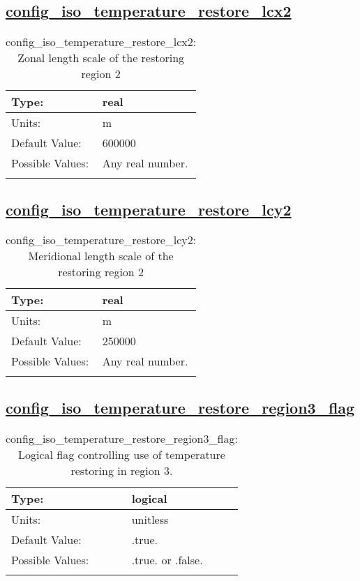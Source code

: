\subsection[config\_iso\_temperature\_restore\_lcx2]{\hyperref[sec:nm_tab_iso]{config\_iso\_temperature\_restore\_lcx2}}
\label{subsec:nm_sec_config_iso_temperature_restore_lcx2}
\begin{center}
\begin{longtable}{| p{2.0in} || p{4.0in} |}
    \hline
    Type: & real \\
    \hline
    Units: & \si{m} \\
    \hline
    Default Value: & 600000 \\
    \hline
    Possible Values: & Any real number. \\
    \hline
    \caption{config\_iso\_temperature\_restore\_lcx2: Zonal length scale of the restoring region 2}
\end{longtable}
\end{center}
\subsection[config\_iso\_temperature\_restore\_lcy2]{\hyperref[sec:nm_tab_iso]{config\_iso\_temperature\_restore\_lcy2}}
\label{subsec:nm_sec_config_iso_temperature_restore_lcy2}
\begin{center}
\begin{longtable}{| p{2.0in} || p{4.0in} |}
    \hline
    Type: & real \\
    \hline
    Units: & \si{m} \\
    \hline
    Default Value: & 250000 \\
    \hline
    Possible Values: & Any real number. \\
    \hline
    \caption{config\_iso\_temperature\_restore\_lcy2: Meridional length scale of the restoring region 2}
\end{longtable}
\end{center}
\subsection[config\_iso\_temperature\_restore\_region3\_flag]{\hyperref[sec:nm_tab_iso]{config\_iso\_temperature\_restore\_region3\_flag}}
\label{subsec:nm_sec_config_iso_temperature_restore_region3_flag}
\begin{center}
\begin{longtable}{| p{2.0in} || p{4.0in} |}
    \hline
    Type: & logical \\
    \hline
    Units: & \si{unitless} \\
    \hline
    Default Value: & .true. \\
    \hline
    Possible Values: & .true. or .false. \\
    \hline
    \caption{config\_iso\_temperature\_restore\_region3\_flag: Logical flag controlling use of temperature restoring in region 3.}
\end{longtable}
\end{center}
